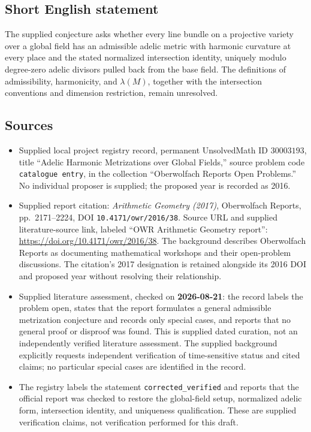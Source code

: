 \documentclass[11pt]{article}
\begin{document}
\subsection{Short English statement}
The supplied conjecture asks whether every line bundle on a projective variety over a global field has an admissible adelic metric with harmonic curvature at every place and the stated normalized intersection identity, uniquely modulo degree-zero adelic divisors pulled back from the base field. The definitions of admissibility, harmonicity, and \(\lambda(M)\), together with the intersection conventions and dimension restriction, remain unresolved.
\subsection{Sources}
\begin{itemize}
\item Supplied local project registry record, permanent UnsolvedMath ID \(30003193\), title ``Adelic Harmonic Metrizations over Global Fields,'' source problem code \texttt{catalogue entry}, in the collection ``Oberwolfach Reports Open Problems.'' No individual proposer is supplied; the proposed year is recorded as 2016.
\item Supplied report citation: \emph{Arithmetic Geometry (2017)}, Oberwolfach Reports, pp.\ 2171--2224, DOI \texttt{10.4171/owr/2016/38}. Source URL and supplied literature-source link, labeled ``OWR Arithmetic Geometry report'': \url{https://doi.org/10.4171/owr/2016/38}. The background describes Oberwolfach Reports as documenting mathematical workshops and their open-problem discussions. The citation's 2017 designation is retained alongside its 2016 DOI and proposed year without resolving their relationship.
\item Supplied literature assessment, checked on \textbf{2026-08-21}: the record labels the problem open, states that the report formulates a general admissible metrization conjecture and records only special cases, and reports that no general proof or disproof was found. This is supplied dated curation, not an independently verified literature assessment. The supplied background explicitly requests independent verification of time-sensitive status and cited claims; no particular special cases are identified in the record.
\item The registry labels the statement \texttt{corrected\_verified} and reports that the official report was checked to restore the global-field setup, normalized adelic form, intersection identity, and uniqueness qualification. These are supplied verification claims, not verification performed for this draft.
\end{itemize}
\end{document}
